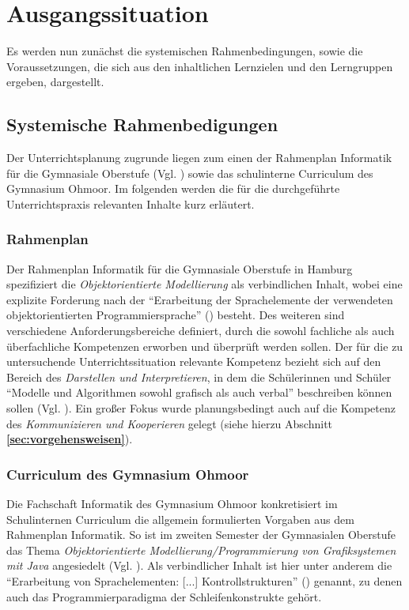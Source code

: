 \documentclass[paper=a4, DIV=13, BCOR=12mm, twoside=on, onecolumn=on, open = any, titlepage =on, parskip =half-, headsepline = on, footsepline = on, chapterprefix = on, sectionprefix = on, appendixprefix = off, fontsize = 11pt, numbers = noenddot, abstract = off]{scrreprt}
\begin{document}
\newpage
\par\singlespacing
\chapter{Ausgangssituation}
Es werden nun zunächst die systemischen Rahmenbedingungen, sowie die Voraussetzungen, die sich aus den inhaltlichen Lernzielen und den Lerngruppen ergeben, dargestellt.
\par\singlespacing
\section{Systemische Rahmenbedigungen}
\onehalfspacing
Der Unterrichtsplanung zugrunde liegen zum einen der Rahmenplan Informatik für die Gymnasiale Oberstufe (Vgl. \cite{oberstufe:09}) sowie das schulinterne Curriculum des Gymnasium Ohmoor. Im folgenden werden die für die durchgeführte Unterrichtspraxis relevanten Inhalte kurz erläutert.
\subsection{Rahmenplan}
Der Rahmenplan Informatik für die Gymnasiale Oberstufe in Hamburg spezifiziert die \textit{Objektorientierte Modellierung} als verbindlichen Inhalt, wobei eine explizite Forderung nach der "`Erarbeitung der Sprachelemente der verwendeten objektorientierten Programmiersprache"' (\cite[S. 17]{oberstufe:09}) besteht. Des weiteren sind verschiedene Anforderungsbereiche definiert, durch die sowohl fachliche als auch überfachliche Kompetenzen erworben und überprüft werden sollen. Der für die zu untersuchende Unterrichtssituation relevante Kompetenz bezieht sich auf den Bereich des \textit{Darstellen und Interpretieren}, in dem die Schülerinnen und Schüler "`Modelle und Algorithmen sowohl grafisch als auch verbal"' beschreiben können sollen (Vgl. \cite[S.16]{oberstufe:09}). Ein großer Fokus wurde planungsbedingt auch auf die Kompetenz des \textit{Kommunizieren und Kooperieren} gelegt (siehe hierzu Abschnitt \textbf{\ref{sec:vorgehensweisen}}).

\par \singlespacing
\subsection{Curriculum des Gymnasium Ohmoor}
\onehalfspacing
Die Fachschaft Informatik des Gymnasium Ohmoor konkretisiert im Schulinternen Curriculum die allgemein formulierten Vorgaben aus dem Rahmenplan Informatik. So ist im zweiten Semester der Gymnasialen Oberstufe das Thema \textit{Objektorientierte Modellierung/Programmierung von Grafiksystemen mit Java} angesiedelt (Vgl. \cite[S.6f.]{ohmoor:16}). Als verbindlicher Inhalt ist hier unter anderem die "`Erarbeitung von Sprachelementen: [...] Kontrollstrukturen"' (\cite[S.7]{ohmoor:16}) genannt, zu denen auch das Programmierparadigma der Schleifenkonstrukte gehört.
\end{document}
